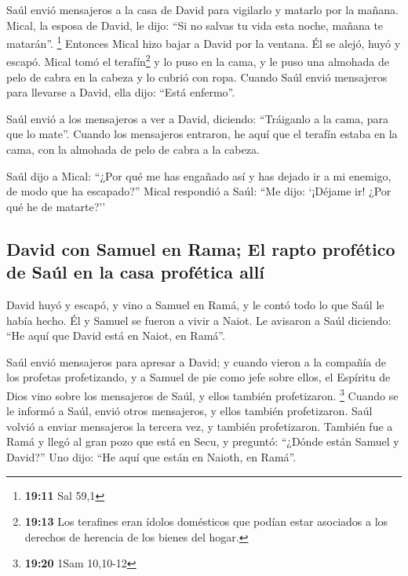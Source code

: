 \begin{paracol}{2}
 Saúl envió mensajeros a la casa de David para vigilarlo
y matarlo por la mañana. Mical, la esposa de David, le dijo: ``Si no
salvas tu vida esta noche, mañana te matarán''. \footnote{\textbf{19:11}
  Sal 59,1}  Entonces Mical hizo bajar a David por la
ventana. Él se alejó, huyó y escapó.  Mical tomó el
terafín\footnote{\textbf{19:13} Los terafines eran ídolos domésticos que
  podían estar asociados a los derechos de herencia de los bienes del
  hogar.} y lo puso en la cama, y le puso una almohada de pelo de cabra
en la cabeza y lo cubrió con ropa.  Cuando Saúl envió
mensajeros para llevarse a David, ella dijo: ``Está enfermo''.

 Saúl envió a los mensajeros a ver a David, diciendo:
``Tráiganlo a la cama, para que lo mate''.  Cuando los
mensajeros entraron, he aquí que el terafín estaba en la cama, con la
almohada de pelo de cabra a la cabeza.

 Saúl dijo a Mical: ``¿Por qué me has engañado así y has
dejado ir a mi enemigo, de modo que ha escapado?'' Mical respondió a
Saúl: ``Me dijo: `¡Déjame ir! ¿Por qué he de matarte?''

\hypertarget{david-con-samuel-en-rama-el-rapto-profuxe9tico-de-sauxfal-en-la-casa-profuxe9tica-alluxed}{%
\subsection{David con Samuel en Rama; El rapto profético de Saúl en la
casa profética
allí}\label{david-con-samuel-en-rama-el-rapto-profuxe9tico-de-sauxfal-en-la-casa-profuxe9tica-alluxed}}

 David huyó y escapó, y vino a Samuel en Ramá, y le contó
todo lo que Saúl le había hecho. Él y Samuel se fueron a vivir a Naiot.
 Le avisaron a Saúl diciendo: ``He aquí que David está en
Naiot, en Ramá''.

 Saúl envió mensajeros para apresar a David; y cuando
vieron a la compañía de los profetas profetizando, y a Samuel de pie
como jefe sobre ellos, el Espíritu de Dios vino sobre los mensajeros de
Saúl, y ellos también profetizaron. \footnote{\textbf{19:20} 1Sam
  10,10-12}  Cuando se le informó a Saúl, envió otros
mensajeros, y ellos también profetizaron. Saúl volvió a enviar
mensajeros la tercera vez, y también profetizaron. 
También fue a Ramá y llegó al gran pozo que está en Secu, y preguntó:
``¿Dónde están Samuel y David?'' Uno dijo: ``He aquí que están en
Naioth, en Ramá''.


\end{paracol}

